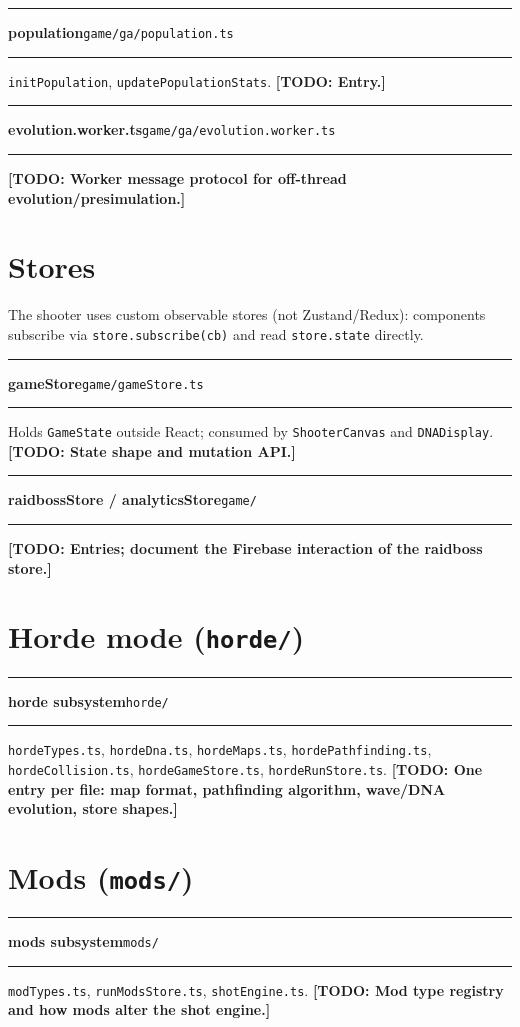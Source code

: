 \documentclass[11pt,a4paper]{report}
\newcommand{\todo}[1]{\textcolor{red!70!black}{\textbf{[TODO: #1]}}}
\newcommand{\srcfile}[1]{\texttt{\small #1}}   %
\newcommand{\ts}[1]{\texttt{#1}}               %
\newenvironment{apientry}[2]{%
  \par\medskip\noindent
  \begin{minipage}{\textwidth}
  \hrule\vspace{0.6ex}
  {\large\ttfamily\bfseries #1}\hfill{\footnotesize\srcfile{#2}}
  \vspace{0.4ex}\hrule\medskip
}{%
  \end{minipage}\par\medskip
}
\begin{document}
\begin{apientry}{population}{game/ga/population.ts}
\ts{initPopulation}, \ts{updatePopulationStats}. \todo{Entry.}
\end{apientry}

\begin{apientry}{evolution.worker.ts}{game/ga/evolution.worker.ts}
\todo{Worker message protocol for off-thread evolution/presimulation.}
\end{apientry}

\section{Stores}

The shooter uses custom observable stores (not Zustand/Redux): components
subscribe via \ts{store.subscribe(cb)} and read \ts{store.state} directly.

\begin{apientry}{gameStore}{game/gameStore.ts}
Holds \ts{GameState} outside React; consumed by \ts{ShooterCanvas} and
\ts{DNADisplay}. \todo{State shape and mutation API.}
\end{apientry}

\begin{apientry}{raidbossStore / analyticsStore}{game/}
\todo{Entries; document the Firebase interaction of the raidboss store.}
\end{apientry}

\section{Horde mode (\srcfile{horde/})}

\begin{apientry}{horde subsystem}{horde/}
\ts{hordeTypes.ts}, \ts{hordeDna.ts}, \ts{hordeMaps.ts},
\ts{hordePathfinding.ts}, \ts{hordeCollision.ts}, \ts{hordeGameStore.ts},
\ts{hordeRunStore.ts}. \todo{One entry per file: map format, pathfinding
algorithm, wave/DNA evolution, store shapes.}
\end{apientry}

\section{Mods (\srcfile{mods/})}

\begin{apientry}{mods subsystem}{mods/}
\ts{modTypes.ts}, \ts{runModsStore.ts}, \ts{shotEngine.ts}.
\todo{Mod type registry and how mods alter the shot engine.}
\end{apientry}
\end{document}
